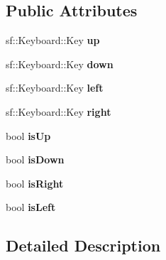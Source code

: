 \subsection*{Public Attributes}
\begin{DoxyCompactItemize}
\item 
\hypertarget{structAUserInput_1_1SKeyStates_a738215f9ee9440c8f11aa0a10fa83d42}{sf\-::\-Keyboard\-::\-Key {\bfseries up}}\label{structAUserInput_1_1SKeyStates_a738215f9ee9440c8f11aa0a10fa83d42}

\item 
\hypertarget{structAUserInput_1_1SKeyStates_a95d21217e452090bd28017c8b1110e5d}{sf\-::\-Keyboard\-::\-Key {\bfseries down}}\label{structAUserInput_1_1SKeyStates_a95d21217e452090bd28017c8b1110e5d}

\item 
\hypertarget{structAUserInput_1_1SKeyStates_aea4dc08983d8f716718a3792c779ff5c}{sf\-::\-Keyboard\-::\-Key {\bfseries left}}\label{structAUserInput_1_1SKeyStates_aea4dc08983d8f716718a3792c779ff5c}

\item 
\hypertarget{structAUserInput_1_1SKeyStates_aa9551aac4a89e8c78e20d4a12a8afcee}{sf\-::\-Keyboard\-::\-Key {\bfseries right}}\label{structAUserInput_1_1SKeyStates_aa9551aac4a89e8c78e20d4a12a8afcee}

\item 
\hypertarget{structAUserInput_1_1SKeyStates_ab227ece210dcf94947d71b21b6ea906e}{bool {\bfseries is\-Up}}\label{structAUserInput_1_1SKeyStates_ab227ece210dcf94947d71b21b6ea906e}

\item 
\hypertarget{structAUserInput_1_1SKeyStates_af06f59dc7cb752237f23e6aceac4453e}{bool {\bfseries is\-Down}}\label{structAUserInput_1_1SKeyStates_af06f59dc7cb752237f23e6aceac4453e}

\item 
\hypertarget{structAUserInput_1_1SKeyStates_afcf8a092b05f9ce67f4b2c5ea73a1f40}{bool {\bfseries is\-Right}}\label{structAUserInput_1_1SKeyStates_afcf8a092b05f9ce67f4b2c5ea73a1f40}

\item 
\hypertarget{structAUserInput_1_1SKeyStates_ab29367ed4bde7e4dd9884d75f300e5ec}{bool {\bfseries is\-Left}}\label{structAUserInput_1_1SKeyStates_ab29367ed4bde7e4dd9884d75f300e5ec}

\end{DoxyCompactItemize}


\subsection{Detailed Description}


